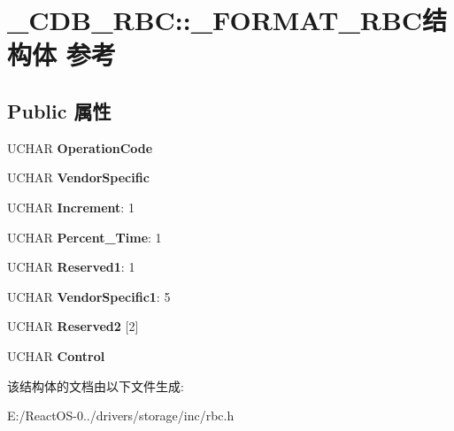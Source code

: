 \hypertarget{struct___c_d_b___r_b_c_1_1___f_o_r_m_a_t___r_b_c}{}\section{\+\_\+\+C\+D\+B\+\_\+\+R\+BC\+:\+:\+\_\+\+F\+O\+R\+M\+A\+T\+\_\+\+R\+B\+C结构体 参考}
\label{struct___c_d_b___r_b_c_1_1___f_o_r_m_a_t___r_b_c}
\subsection*{Public 属性}
\begin{DoxyCompactItemize}
\item 
\mbox{\label{struct___c_d_b___r_b_c_1_1___f_o_r_m_a_t___r_b_c_aa0ed4d080c556d9b86a8c4356e086b7f}} 
U\+C\+H\+AR {\bfseries Operation\+Code}
\item 
\mbox{\label{struct___c_d_b___r_b_c_1_1___f_o_r_m_a_t___r_b_c_abe5245e9ff4d0554ef326af6b3865d0a}} 
U\+C\+H\+AR {\bfseries Vendor\+Specific}
\item 
\mbox{\label{struct___c_d_b___r_b_c_1_1___f_o_r_m_a_t___r_b_c_a119e6e75d9845f510227c48d5901f532}} 
U\+C\+H\+AR {\bfseries Increment}\+: 1
\item 
\mbox{\label{struct___c_d_b___r_b_c_1_1___f_o_r_m_a_t___r_b_c_adcb8bd33dfbe4dc9d7c47d56bfcb0f33}} 
U\+C\+H\+AR {\bfseries Percent\+\_\+\+Time}\+: 1
\item 
\mbox{\label{struct___c_d_b___r_b_c_1_1___f_o_r_m_a_t___r_b_c_a5a069c57fa59b03a5e588fefc39653fa}} 
U\+C\+H\+AR {\bfseries Reserved1}\+: 1
\item 
\mbox{\label{struct___c_d_b___r_b_c_1_1___f_o_r_m_a_t___r_b_c_aa4fd5c03593e5a7cc534c20cd8192cc0}} 
U\+C\+H\+AR {\bfseries Vendor\+Specific1}\+: 5
\item 
\mbox{\label{struct___c_d_b___r_b_c_1_1___f_o_r_m_a_t___r_b_c_a5fa1910cb964214c97ce2593e954ae39}} 
U\+C\+H\+AR {\bfseries Reserved2} \mbox{[}2\mbox{]}
\item 
\mbox{\label{struct___c_d_b___r_b_c_1_1___f_o_r_m_a_t___r_b_c_ac1c28ab343ec4f83ccca8d12f44ec414}} 
U\+C\+H\+AR {\bfseries Control}
\end{DoxyCompactItemize}


该结构体的文档由以下文件生成\+:\begin{DoxyCompactItemize}
\item 
E\+:/\+React\+O\+S-\/0../drivers/storage/inc/rbc.\+h\end{DoxyCompactItemize}
